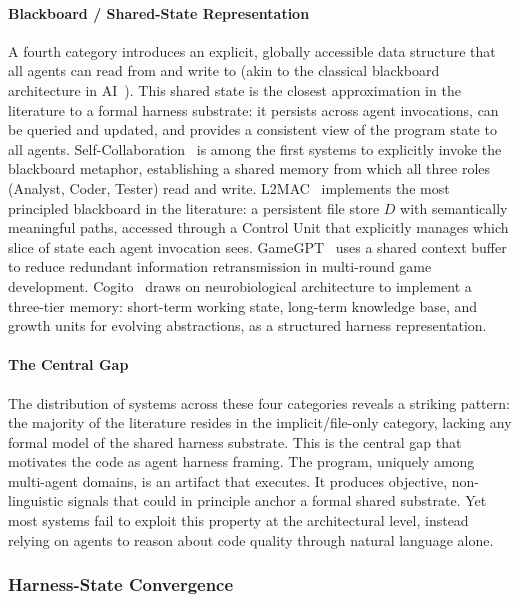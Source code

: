 \paragraph{Blackboard / Shared-State Representation}

A fourth category introduces an explicit, globally accessible
data structure that all agents can read from and write to (akin
to the classical blackboard architecture in
AI~\cite{erman1980hearsay}). This shared state is the closest
approximation in the literature to a formal harness substrate: it
persists across agent invocations, can be queried and updated,
and provides a consistent view of the program state to all
agents. Self-Collaboration~\cite{Dong2024SelfCollaboration} is
among the first systems to explicitly invoke the blackboard
metaphor, establishing a shared memory from which all three roles
(Analyst, Coder, Tester) read and write.
L2MAC~\cite{Holt2023L2MAC} implements the most principled
blackboard in the literature: a persistent file store $D$ with
semantically meaningful paths, accessed through a Control Unit
that explicitly manages which slice of state each agent
invocation sees. GameGPT~\cite{chen2023gamegpt} uses a shared
context buffer to reduce redundant information retransmission in
multi-round game development. Cogito~\cite{Li2025Cogito} draws on
neurobiological architecture to implement a three-tier memory:
short-term working state, long-term knowledge base, and growth
units for evolving abstractions, as a structured harness
representation.

\paragraph{The Central Gap}

The distribution of systems across these four categories reveals
a striking pattern: the majority of the literature resides in the
implicit/file-only category, lacking any formal model of the
shared harness substrate. This is the central gap that motivates
the code as agent harness framing. The program, uniquely among
multi-agent domains, is an artifact that executes. It produces
objective, non-linguistic signals that could in principle anchor
a formal shared substrate. Yet most systems fail to exploit this
property at the architectural level, instead relying on agents to
reason about code quality through natural language alone.


\subsubsection{Harness-State Convergence}


